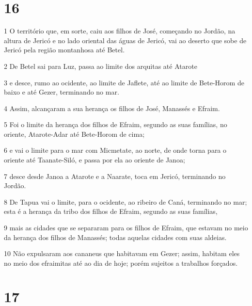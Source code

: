 \chapter{16}

\par 1 O território que, em sorte, caiu aos filhos de José, começando no Jordão, na altura de Jericó e no lado oriental das águas de Jericó, vai ao deserto que sobe de Jericó pela região montanhosa até Betel.
\par 2 De Betel sai para Luz, passa ao limite dos arquitas até Atarote
\par 3 e desce, rumo ao ocidente, ao limite de Jaflete, até ao limite de Bete-Horom de baixo e até Gezer, terminando no mar.
\par 4 Assim, alcançaram a sua herança os filhos de José, Manassés e Efraim.
\par 5 Foi o limite da herança dos filhos de Efraim, segundo as suas famílias, no oriente, Atarote-Adar até Bete-Horom de cima;
\par 6 e vai o limite para o mar com Micmetate, ao norte, de onde torna para o oriente até Taanate-Siló, e passa por ela ao oriente de Janoa;
\par 7 desce desde Janoa a Atarote e a Naarate, toca em Jericó, terminando no Jordão.
\par 8 De Tapua vai o limite, para o ocidente, ao ribeiro de Caná, terminando no mar; esta é a herança da tribo dos filhos de Efraim, segundo as suas famílias,
\par 9 mais as cidades que se separaram para os filhos de Efraim, que estavam no meio da herança dos filhos de Manassés; todas aquelas cidades com suas aldeias.
\par 10 Não expulsaram aos cananeus que habitavam em Gezer; assim, habitam eles no meio dos efraimitas até ao dia de hoje; porém sujeitos a trabalhos forçados.

\chapter{17}

